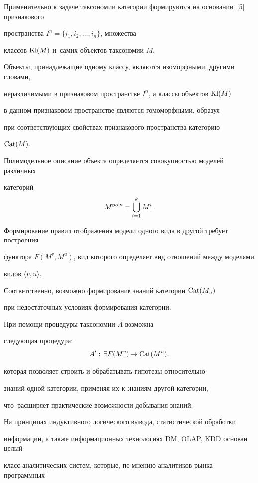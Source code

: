 Применительно к задаче таксономии категории формируются на основании~[5] признакового

пространства $I^n=\{ i_1, i_2, \dots, i_n \}$, множества

классов ${\rm Kl}(M)$ и~самих объектов таксономии $M$.

Объекты, принадлежащие одному классу, являются изоморфными, другими словами,

неразличимыми в признаковом пространстве $I^n$, а классы объектов ${\rm Kl}(M )$

в данном признаковом пространстве являются гомоморфными, образуя

при соответствующих свойствах признакового пространства категорию

${\rm Cat}(M)$.



Полимодельное описание объекта определяется совокупностью моделей различных

категорий $$

M^{\rm poly}=\bigcup\limits_{i=1}^k {M^i}  .

$$

Формирование правил отображения модели одного вида в другой требует построения

функтора $F( M^v, M^u)$, вид которого определяет вид отношений между моделями

видов $\langle v, u\rangle $.

Соответственно, возможно формирование знаний категории ${\rm Cat}( M_u )$

при недостаточных условиях формирования категории.

При помощи процедуры таксономии $A$ возможна

следующая процедура: $$

A':\, \exists F( M^v)\to {\rm Cat}(M^u),

$$

которая позволяет строить и обрабатывать гипотезы относительно

знаний одной категории, применяя их к знаниям другой категории,

что~расширяет практические возможности добывания знаний.



На принципах индуктивного логического вывода, статистической обработки

информации, а также информационных технологиях DM, OLAP, KDD основан целый

класс аналитических систем, которые, по мнению аналитиков рынка программных

